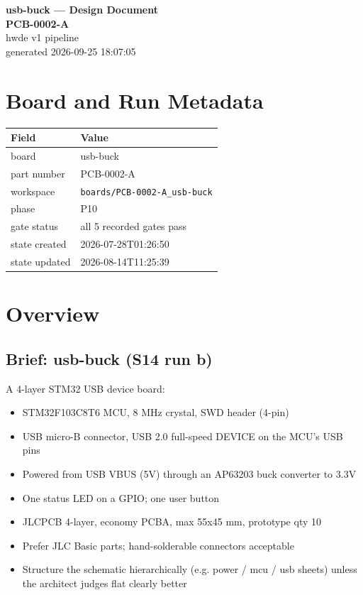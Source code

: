 \documentclass[11pt,a4paper]{article}
\begin{document}
\sloppy
\begin{center}
{\LARGE\bfseries usb-buck --- Design Document}\\[6pt]
{\Large\bfseries PCB-0002-A}\\[6pt]
{\large hwde v1 pipeline}\\[2pt]
generated 2026-09-25 18:07:05
\end{center}
\tableofcontents

\section{Board and Run Metadata}
{\small
\begin{longtable}{lp{11cm}}
\toprule
\textbf{Field} & \textbf{Value} \\
\midrule
\endhead
board & usb-buck \\
part number & PCB-0002-A \\
workspace & \texttt{boards/PCB-0002-A\_usb-buck} \\
phase & P10 \\
gate status & all 5 recorded gates pass \\
state created & 2026-07-28T01:26:50 \\
state updated & 2026-08-14T11:25:39 \\
\bottomrule
\end{longtable}
}
\section{Overview}
\subsection*{Brief: usb-buck (S14 run b)}
A 4-layer STM32 USB device board:

\begin{itemize}
\item STM32F103C8T6 MCU, 8 MHz crystal, SWD header (4-pin)
\item USB micro-B connector, USB 2.0 full-speed DEVICE on the MCU's USB pins
\item Powered from USB VBUS (5V) through an AP63203 buck converter to 3.3V
\item One status LED on a GPIO; one user button
\item JLCPCB 4-layer, economy PCBA, max 55x45 mm, prototype qty 10
\item Prefer JLC Basic parts; hand-solderable connectors acceptable
\item Structure the schematic hierarchically (e.g. power / mcu / usb sheets)
unless the architect judges flat clearly better
\end{itemize}
\end{document}
